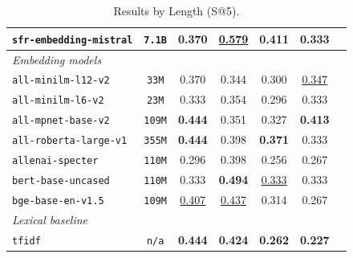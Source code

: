 \documentclass[11pt]{article}
\begin{document}
\begin{table}[h!]
{\begin{tabular}{lcccccc}
\texttt{sfr-embedding-mistral} & \texttt{7.1B} & \textbf{0.370} & \underline{0.579} & 0.411 & \textbf{0.333} \\
\midrule
\multicolumn{6}{l}{\textit{Embedding models}} \\
\midrule
\texttt{all-minilm-l12-v2} & \texttt{33M} & 0.370 & 0.344 & 0.300 & \underline{0.347} \\
\texttt{all-minilm-l6-v2} & \texttt{23M} & 0.333 & 0.354 & 0.296 & 0.333 \\
\texttt{all-mpnet-base-v2} & \texttt{109M} & \textbf{0.444} & 0.351 & 0.327 & \textbf{0.413} \\
\texttt{all-roberta-large-v1} & \texttt{355M} & \textbf{0.444} & 0.398 & \textbf{0.371} & 0.333 \\
\texttt{allenai-specter} & \texttt{110M} & 0.296 & 0.398 & 0.256 & 0.267 \\
\texttt{bert-base-uncased} & \texttt{110M} & 0.333 & \textbf{0.494} & \underline{0.333} & 0.333 \\
\texttt{bge-base-en-v1.5} & \texttt{109M} & \underline{0.407} & \underline{0.437} & 0.314 & 0.267 \\
\midrule
\multicolumn{6}{l}{\textit{Lexical baseline}} \\
\midrule
\texttt{tfidf} & \texttt{n/a} & \textbf{0.444} & \textbf{0.424} & \textbf{0.262} & \textbf{0.227} \\
\bottomrule
\end{tabular}
}
\caption{Results by Length (S@5).}
\label{tab:length-s10-top}
\end{table}
\end{document}
